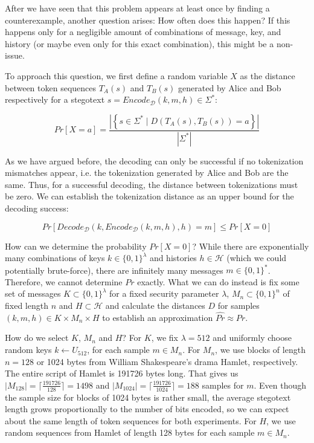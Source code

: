 After we have seen that this problem appears at least once by finding a counterexample, another question arises:
How often does this happen?
If this happens only for a negligible amount of combinations of message, key, and history (or maybe even only for this exact combination), this might be a non-issue.

To approach this question, we first define a random variable $X$ as the distance between token sequences $T_A(s)$ and $T_B(s)$ generated by Alice and Bob respectively for a stegotext $s = Encode_{\mathcal{D}}(k,m,h) \in \Sigma^*$:

$$Pr[X=a] = \frac{\left| \left\{ s \in \Sigma^* \mid D(T_A(s), T_B(s)) = a \right\} \right|}{\left| \Sigma^* \right|}$$

As we have argued before, the decoding can only be successful if no tokenization mismatches appear, i.e. the tokenization generated by Alice and Bob are the same.
Thus, for a successful decoding, the distance between tokenizations must be zero.
We can establish the tokenization distance as an upper bound for the decoding success:

$$Pr[Decode_{\mathcal{D}}(k, Encode_{\mathcal{D}}(k,m,h), h)=m] \leq Pr[X=0]$$

How can we determine the probability $Pr[X=0]$?
While there are exponentially many combinations of keys $k \in \{0,1\}^\lambda$ and histories $h \in \mathcal{H}$ (which we could potentially brute-force), there are infinitely many messages $m \in \{0,1\}^*$.
Therefore, we cannot determine $Pr$ exactly.
What we can do instead is fix some set of messages $K \subset \{0,1\}^\lambda$ for a fixed security parameter $\lambda$, $M_n \subset \{0,1\}^n$ of fixed length $n$ and $H \subset \mathcal{H}$ and calculate the distances $D$ for samples $(k,m,h) \in K \times M_n \times H$ to establish an approximation $\hat{Pr} \approx Pr$.

How do we select $K$, $M_n$ and $H$?
For $K$, we fix $\lambda = 512$ and uniformly choose random keys $k \leftarrow U_{512}$, for each sample $m \in M_n$.
For $M_n$, we use blocks of length $n=128$ or 1024 bytes from William Shakespeare's drama Hamlet, respectively.
The entire script of Hamlet is 191726 bytes long.
That gives us $|M_{128}|=\lceil \frac{191726}{128} \rceil = 1498$ and $|M_{1024}|= \lceil \frac{191726}{1024} \rceil = 188$ samples for $m$.
Even though the sample size for blocks of 1024 bytes is rather small, the average stegotext length grows proportionally to the number of bits encoded, so we can expect about the same length of token sequences for both experiments.
For $H$, we use random sequences from Hamlet of length 128 bytes for each sample $m \in M_n$.

